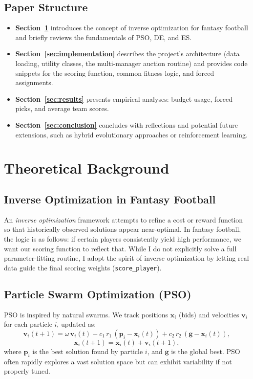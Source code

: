 \documentclass[sigconf]{acmart}
\begin{document}
	\subsection{Paper Structure}
	\begin{itemize}
\item \textbf{Section~\ref{sec:theory}} introduces the concept of inverse optimization for fantasy football and briefly reviews the fundamentals of PSO, DE, and ES.
\item \textbf{Section~\ref{sec:implementation}} describes the project’s architecture (data loading, utility classes, the multi-manager auction routine) and provides code snippets for the scoring function, common fitness logic, and forced assignments.
\item \textbf{Section~\ref{sec:results}} presents empirical analyses: budget usage, forced picks, and average team scores.
\item \textbf{Section~\ref{sec:conclusion}} concludes with reflections and potential future extensions, such as hybrid evolutionary approaches or reinforcement learning.
	\end{itemize}
	
	\section{Theoretical Background}
	\label{sec:theory}
	
	\subsection{Inverse Optimization in Fantasy Football}
	An \emph{inverse optimization} framework attempts to refine a cost or reward function so that historically observed solutions appear near-optimal. In fantasy football, the logic is as follows: if certain players consistently yield high performance, we want our scoring function to reflect that. While I do not explicitly solve a full parameter-fitting routine, I adopt the spirit of inverse optimization by letting real data guide the final scoring weights (\texttt{score\_player}).
	
	\subsection{Particle Swarm Optimization (PSO)}
	PSO is inspired by natural swarms. We track positions $\mathbf{x}_i$ (bids) and velocities $\mathbf{v}_i$ for each particle $i$, updated as:
	\[
	\mathbf{v}_i(t+1)
	= \omega\,\mathbf{v}_i(t)
	+ c_1\,r_1\,(\mathbf{p}_i - \mathbf{x}_i(t))
	+ c_2\,r_2\,(\mathbf{g} - \mathbf{x}_i(t)),
	\]
	\[
	\mathbf{x}_i(t+1) = \mathbf{x}_i(t) + \mathbf{v}_i(t+1),
	\]
	where $\mathbf{p}_i$ is the best solution found by particle $i$, and $\mathbf{g}$ is the global best. PSO often rapidly explores a vast solution space but can exhibit variability if not properly tuned.
	
\end{document}
